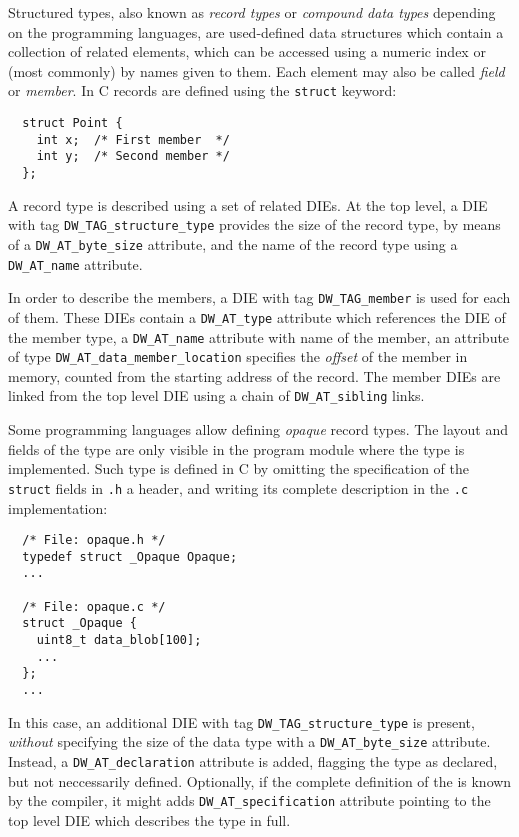 Structured types, also known as \emph{record types} or \emph{compound data
types} depending on the programming languages, are used-defined data
structures which contain a collection of related elements, which can be
accessed using a numeric index or (most commonly) by names given to them. Each
element may also be called \emph{field} or \emph{member}. In C records are
defined using the \texttt{struct} keyword:

\begin{verbatim}
  struct Point {
    int x;  /* First member  */
    int y;  /* Second member */
  };
\end{verbatim}

A record type is described using a set of related DIEs. At the top level,
a DIE with tag \verb|DW_TAG_structure_type| provides the size of the record
type, by means of a \verb|DW_AT_byte_size| attribute, and the name of the
record type using a \verb|DW_AT_name| attribute.

In order to describe the members, a DIE with tag \verb|DW_TAG_member| is
used for each of them. These DIEs contain a \verb|DW_AT_type| attribute
which references the DIE of the member type, a \verb|DW_AT_name| attribute
with name of the member, an attribute of type
\verb|DW_AT_data_member_location| specifies the \emph{offset} of the member in
memory, counted from the starting address of the record. The member DIEs are
linked from the top level DIE using a chain of \verb|DW_AT_sibling| links.

Some programming languages allow defining \emph{opaque} record types. The
layout and fields of the type are only visible in the program module where the
type is implemented. Such type is defined in C by omitting the specification
of the \texttt{struct} fields in \verb|.h| a header, and writing its
complete description in the \verb|.c| implementation:

\begin{verbatim}
  /* File: opaque.h */
  typedef struct _Opaque Opaque;
  ...

  /* File: opaque.c */
  struct _Opaque {
    uint8_t data_blob[100];
    ...
  };
  ...
\end{verbatim}

In this case, an additional DIE with tag \verb|DW_TAG_structure_type| is
present, \emph{without} specifying the size of the data type with
a \verb|DW_AT_byte_size| attribute. Instead, a \verb|DW_AT_declaration|
attribute is added, flagging the type as declared, but not neccessarily
defined. Optionally, if the complete definition of the is known by the
compiler, it might adds \verb|DW_AT_specification| attribute pointing to the
top level DIE which describes the type in full.


